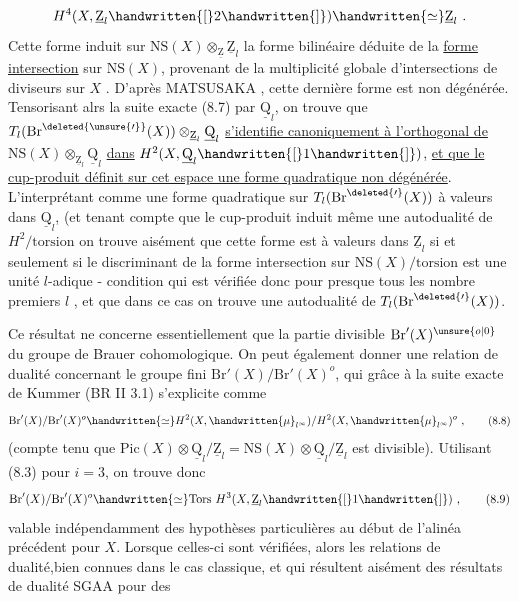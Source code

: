 \[
H^4(X,\underline{\mathrm Z}_l\handwritten{[}2\handwritten{]})\handwritten{\simeq}\underline{\mathrm Z}_l\ .
\]
 Cette forme  induit sur $\mathrm{NS}(X)\otimes_{\underline{\mathrm Z}}\underline{\mathrm Z}_l$ la forme bilinéaire déduite de la \uline{forme intersection} sur $\mathrm{NS}(X)$, provenant de la multiplicité globale d'intersections de diviseurs sur $X$ \margin{\handwritten{$\times$}}\handwritten{[15]} \deleted{\unsure{;}}. D'après \margin{\handwritten{$\times$}}MATSUSAKA \handwritten{[27]}, cette dernière forme est non dégénérée. Tensorisant alrs la suite exacte (8.7) par $\underline{\mathrm Q}_l$, on trouve que $T_l(\mathrm{Br}^{\deleted{\unsure{\prime}}}(X))\otimes_{\underline{\mathrm Z}_l}\underline{\mathrm Q}_l$ \uline{s'identifie canoniquement à l'orthogonal de} $\mathrm{NS}(X)\otimes_{\underline{\mathrm Z}_l}\underline{\mathrm Q}_l$ \uline{dans} $H^2(X,\underline{\mathrm Q}_l\handwritten{[}1\handwritten{]})$, \uline{et que le cup-produit définit sur cet espace une forme quadratique non dégénérée}. L'interprétant comme une forme quadratique sur $T_l(\mathrm{Br}^{\deleted{\prime}}(X))$ à valeurs dans $\underline{\mathrm Q}_l$, (et tenant compte que le cup-produit induit même une autodualité de $H^2/\text{torsion}$\unsure{)|),|;)} on trouve aisément que cette forme est à valeurs dans $\underline{\mathrm Z}_l$ si et seulement si le discriminant de la forme intersection sur $\mathrm{NS}(X)/\text{torsion}$ est une unité $l$-adique - condition qui est vérifiée donc pour presque tous les nombre premiers $l$ \unsure{-}, et que dans ce cas on trouve une autodualité de $T_l(\mathrm{Br}^{\deleted{\prime}}(X))$.

 Ce résultat ne concerne essentiellement que la partie divisible $\mathrm{Br}'(X)^{\unsure{o|0}}$ du groupe de Brauer cohomologique. On peut également donner une relation de dualité concernant le  groupe fini $\mathrm{Br}'(X)/\mathrm{Br}'(X)^o$, qui grâce à la suite exacte de Kummer (BR II 3.1) s'explicite comme
\[
\mathrm{Br}'(X)/\mathrm{Br}'(X)^o\handwritten{\simeq}H^2(X,\handwritten{\mu}_{l^\infty})/H^2(X,\handwritten{\mu}_{l^\infty})^o\ , \tag*{(8.8)}
\]
(compte tenu que $\mathrm{Pic}(X)\otimes\underline{\mathrm Q}_l/\underline{\mathrm Z}_l=\mathrm{NS}(X)\otimes\underline{\mathrm Q}_l/\underline{\mathrm Z}_l$ est divisible). Utilisant (8.3) pour $i=3$, on trouve donc
\[
\mathrm{Br}'(X)/\mathrm{Br}'(X)^o\handwritten{\simeq}\mathrm{Tors}\ H^3(X,\underline{\mathrm Z}_l\handwritten{[}1\handwritten{]})\ , \tag*{(8.9)}
\]
\handwritten{(}valable indépendamment des hypothèses particulières  au début de l'alinéa précédent pour $X$. Lorsque celles-ci sont vérifiées, alors les relations de dualité,bien connues dans le cas classique, et qui résultent aisément  des résultats de dualité \margin{\handwritten{$\times$}}\handwritten{[}SGAA \handwritten{$\underline{\overline{\mathrm{XIX}}}$\quad]} pour des
